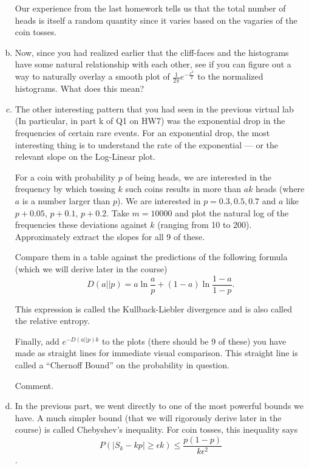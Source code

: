 \documentclass[]{article}
\begin{document}
\begin{qunlist}
\begin{enumerate}[a)]
 Our experience from the last homework tells us that the total number
 of heads is itself a random quantity since it varies based on the
 vagaries of the coin tosses.


\qpart 
\item Now, since you had realized earlier that the cliff-faces and the
  histograms have some natural relationship with each other, see if
  you can figure out a way to naturally overlay a smooth plot of
  $\frac{1}{2\pi} e^{-\frac{x^2}{2}}$ to the normalized
  histograms. What does this mean?

\qpart
\item The other interesting pattern that you had seen in the previous
  virtual lab (In particular, in part k of Q1 on HW7) was the
  exponential drop in the frequencies of certain rare events. For an
  exponential drop, the most interesting thing is to understand the
  rate of the exponential --- or the relevant slope on the Log-Linear
  plot.  

  For a coin with probability $p$ of being heads, we are interested in
  the frequency by which tossing $k$ such coins results in more than
  $ak$ heads (where $a$ is a number larger than $p$). We are
  interested in $p=0.3,0.5,0.7$ and $a$ like $p+0.05$,
  $p+0.1$, $p+0.2$.  Take $m = 10000$ and plot the natural log of the frequencies 
  these deviations against $k$ (ranging from 10 to 200). Approximately
  extract the slopes for all 9 of these.

  Compare them in a table against the predictions of the following
  formula (which we will derive later in the course)
  $$D(a||p) = a \ln \frac{a}{p} + (1-a) \ln \frac{1-a}{1-p}.$$
  
  This expression is called the Kullback-Liebler divergence and is also
  called the relative entropy. 

  Finally, add $e^{-D(a||p) k}$ to the plots (there should be 9 of
  these) you have made as straight lines for immediate visual
  comparison. This straight line is called a ``Chernoff Bound'' on the
  probability in question. 

  Comment. 

\qpart
\item In the previous part, we went directly to one of the most
  powerful bounds we have. A much simpler bound (that we will
  rigorously derive later in the course) is called Chebyshev's
  inequality. For coin tosses, this inequality says 
$$P(|S_k - k p| \geq \epsilon k) \leq \frac{ p (1-p)}{k \epsilon^2}$$. 


\end{enumerate}
\end{qunlist}
\end{document}
